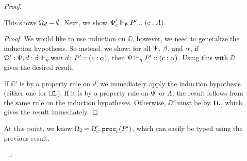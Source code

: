 \begin{proof}
\begin{description}
    This shows $\Omega_d = \emptyset$. Next, we show ${\Psi_c'} \Vdash_{\emptyset} P' :: (c : A)$.
    \begin{proof}
      We would like to use induction on $\DD$, however, we need to generalize the induction hypothesis. So instead, we show: for all $\Psi$, $\beta$, and $\alpha$, if $\mathcal{D}' : {\Psi, d : \beta} \Vdash_{\eta} \mathrm{wait}\;d \,;\, P' :: (c : \alpha)$, then ${\Psi} \Vdash_{\eta} P' :: (c : \alpha)$. Using this with $\DD$ gives the desired result.

      If $\DD'$ is by a property rule on $d$, we immediately apply the induction hypothesis (either one for $\mathbin{\sqcup}\texttt{L}$). If it is by a property rule on $\Psi$ or $A$, the result follows from the same rule on the induction hypotheses. Otherwise, $\DD'$ must be by $\mathbf{1}\texttt{L}$, which gives the result immediately.
    \end{proof}

    At this point, we know $\Omega_2 = \Omega_c', \mathtt{proc}_{c}(P')$, which can easily be typed using the previous result.


\end{description}
\end{proof}
